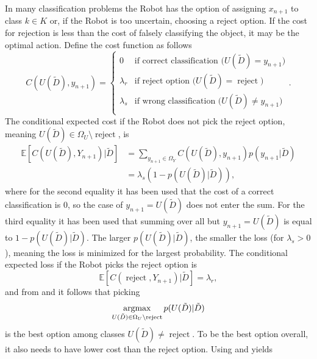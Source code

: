 \begin{example}
	In many classification problems the Robot has the option of assigning $x_{n+1}$ to class $k\in K$ or, if the Robot is too uncertain, choosing a reject option. If the cost for rejection is less than the cost of falsely classifying the object, it may be the optimal action. Define the cost function as follows
	\begin{equation}
		C(U(\tilde{D}),y_{n+1})=\begin{cases}
			0 & \text{if correct classification ($U(\tilde{D})=y_{n+1}$)}\\
			\lambda_r & \text{if reject option ($U(\tilde{D})=\operatorname{reject}$)}\\
			\lambda_s & \text{if wrong classification ($U(\tilde{D})\neq y_{n+1}$)}\\
		\end{cases}.
	\end{equation}
	The conditional expected cost if the Robot does not pick the reject option, meaning $U(\tilde{D})\in \Omega_U\setminus\operatorname{reject}$, is
	\begin{equation}
		\begin{split}
			\mathbb{E}[C(U(\tilde{D}), Y_{n+1})|\tilde{D}] & = \sum_{y_{n+1}\in \Omega_Y} C(U(\tilde{D}),y_{n+1})p(y_{n+1}|\tilde{D})\\
			&= \lambda_s(1-p(U(\tilde{D})|\tilde{D})),
		\end{split}
		\label{eq:cost1a}
	\end{equation}
	where for the second equality it has been used that the cost of a correct classification is $0$, so the case of $y_{n+1}=U(\tilde{D})$ does not enter the sum. For the third equality it has been used that summing over all but $y_{n+1} =U(\tilde{D})$ is equal to $1-p(U(\tilde{D})|\tilde{D})$. The larger $p(U(\tilde{D})|\tilde{D})$, the smaller the loss (for $\lambda_s>0$), meaning the loss is minimized for the largest probability. The conditional expected loss if the Robot picks the reject option is
	\begin{equation}
		\mathbb{E}[C(\operatorname{reject}, Y_{n+1})|\tilde{D}]=\lambda_r,
		\label{eq:cost2a}
	\end{equation}
	and from  and  it follows that picking 
	\begin{equation}
		\operatorname*{argmax}_{U(\tilde{D})\in \Omega_U\setminus \operatorname{reject}} p(U(\tilde{D})|\tilde{D})
	\end{equation}
	is the best option among classes $U(\tilde{D})\neq \operatorname{reject}$. To be the best option overall, it also needs to have lower cost than the reject option. Using  and  yields

\end{example}
